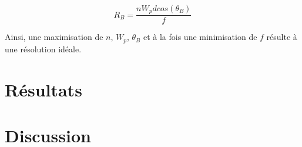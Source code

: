 \documentclass[11pt,letterpaper]{article}
\begin{document}
\begin{equation}
    R_B=\frac{n W_p d cos(\theta_B)}{ f}
\end{equation}

Ainsi, une maximisation de $n$, $W_p$, $\theta_B$ et à la fois une minimisation de $f$ résulte à une résolution idéale.\cite{res_blasé}
\section{Résultats}

\section{Discussion}


\end{document}
